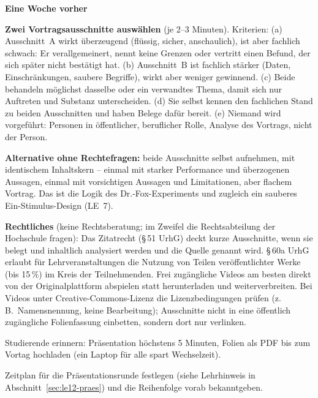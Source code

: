 \begin{vorbereitung}
\textbf{Eine Woche vorher}
\begin{checkliste}
  \item \textbf{Zwei Vortragsausschnitte auswählen} (je 2--3 Minuten).
    Kriterien: (a) Ausschnitt~A wirkt überzeugend (flüssig, sicher,
    anschaulich), ist aber fachlich schwach: Er verallgemeinert, nennt keine
    Grenzen oder vertritt einen Befund, der sich später nicht bestätigt hat.
    (b) Ausschnitt~B ist fachlich stärker (Daten, Einschränkungen,
    saubere Begriffe), wirkt aber weniger gewinnend. (c) Beide behandeln
    möglichst dasselbe oder ein verwandtes Thema, damit sich nur
    Auftreten und Substanz unterscheiden. (d) Sie selbst kennen den
    fachlichen Stand zu beiden Ausschnitten und haben Belege dafür
    bereit. (e) Niemand wird vorgeführt: Personen in öffentlicher,
    beruflicher Rolle, Analyse des Vortrags, nicht der Person.
  \item \textbf{Alternative ohne Rechtefragen:} beide Ausschnitte selbst
    aufnehmen, mit identischem Inhaltskern -- einmal mit starker Performance
    und überzogenen Aussagen, einmal mit vorsichtigen Aussagen und
    Limitationen, aber flachem Vortrag. Das ist die Logik des
    Dr.-Fox-Experiments \parencite{naftulin1973drfox} und zugleich ein
    sauberes Ein-Stimulus-Design (LE~7).
  \item \textbf{Rechtliches} (keine Rechtsberatung; im Zweifel die
    Rechtsabteilung der Hochschule fragen): Das Zitatrecht (§\,51 UrhG)
    deckt kurze Ausschnitte, wenn sie belegt und inhaltlich analysiert
    werden und die Quelle genannt wird. §\,60a UrhG erlaubt für
    Lehrveranstaltungen die Nutzung von Teilen veröffentlichter Werke
    (bis 15\,\%) im Kreis der Teilnehmenden. Frei zugängliche Videos am
    besten direkt von der Originalplattform abspielen statt herunterladen
    und weiterverbreiten. Bei Videos unter Creative-Commons-Lizenz die
    Lizenzbedingungen prüfen (z.\,B.\ Namensnennung, keine Bearbeitung);
    Ausschnitte nicht in eine öffentlich zugängliche Folienfassung
    einbetten, sondern dort nur verlinken.
  \item Studierende erinnern: Präsentation höchstens 5 Minuten, Folien
    als PDF bis zum Vortag hochladen (ein Laptop für alle spart
    Wechselzeit).
  \item Zeitplan für die Präsentationsrunde festlegen (siehe
    Lehrhinweis in Abschnitt~\ref{sec:le12-praes}) und die Reihenfolge
    vorab bekanntgeben.
\end{checkliste}


\end{vorbereitung}
